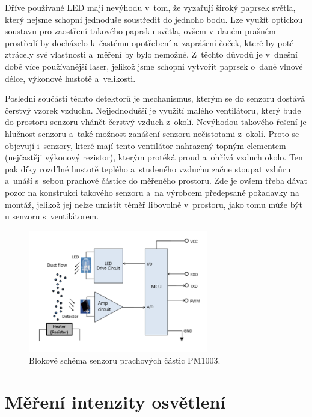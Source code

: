 Dříve používané LED mají nevýhodu v~tom, že vyzařují široký paprsek světla, který nejsme schopni jednoduše soustředit do jednoho bodu. Lze využít optickou soustavu pro zaostření takového paprsku světla, ovšem v~daném prašném prostředí by docházelo k~častému opotřebení a~zaprášení čoček, které by poté ztrácely své vlastnosti a~měření by bylo nemožné. Z~těchto důvodů je v~dnešní době více používanější laser, jelikož jsme schopni vytvořit paprsek o~dané vlnové délce, výkonové hustotě a~velikosti. 

Poslední součástí těchto detektorů je mechanismus, kterým se do senzoru dostává čerstvý vzorek vzduchu. Nejjednodušší je využití malého ventilátoru, který bude do prostoru senzoru vhánět čerstvý vzduch z~okolí. Nevýhodou takového řešení je hlučnost senzoru a~také možnost zanášení senzoru nečistotami z~okolí. Proto se objevují i~senzory, které mají tento ventilátor nahrazený topným elementem (nejčastěji výkonový rezistor), kterým protéká proud a~ohřívá vzduch okolo. Ten pak díky rozdílné hustotě teplého a~studeného vzduchu začne stoupat vzhůru a~unáší s~sebou prachové částice do měřeného prostoru. Zde je ovšem třeba dávat pozor na konstrukci takového senzoru a~na výrobcem předepsané požadavky na montáž, jelikož jej nelze umístit téměř libovolně v~prostoru, jako tomu může být u senzoru s~ventilátorem.

\begin{figure}
    \centering
    \includegraphics[width=0.70\textwidth]{obrazky/dustSensorPrinciple.png}
    \caption{Blokové schéma senzoru prachových částic PM1003. \cite{PM1003Datasheet}}
    \label{fig_dustSensorPrinciple}
\end{figure}

\section{Měření intenzity osvětlení}

